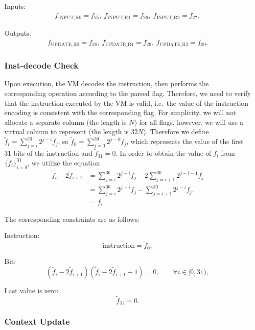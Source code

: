 Inputs:
\begin{align*}
    f_\text{INPUT\_R0} = f_{25},\ f_\text{INPUT\_R1} = f_{26},\ f_\text{INPUT\_R2} = f_{27},
\end{align*}

Outputs:
\begin{align*}
    f_\text{UPDATE\_R0} = f_{28},\ f_\text{UPDATE\_R1} = f_{29},\ f_\text{UPDATE\_R2} = f_{30}.
\end{align*}

\subsubsection{Inst-decode Check}

Upon execution, the VM decodes the instruction, then performs the corresponding operation according to the parsed flag. Therefore, we need to verify that the instruction executed by the VM is valid, i.e.\ the value of the instruction encoding is consistent with the corresponding flag. For simplicity, we will not allocate a separate column (the length is $N$) for all flags, however, we will use a virtual column to represent (the length is $32N$). Therefore we define $\widetilde f_i = \sum_{j=i}^{30} 2^{j-i} f_j$, so $\widetilde f_0 = \sum_{j=0}^{30} 2^{j-0} f_j$, which represents the value of the first 31 bits of the instruction and $\widetilde f_{31} = 0$. In order to obtain the value of $f_i$ from $\{\widetilde f_i \}_{i=0}^{31}$, we utilize the equation
\begin{align*}
    \widetilde f_i - 2\widetilde f_{i+1} &= \sum_{j=i}^{30} 2^{j-i} f_j - 2 \sum_{j=i+1}^{30} 2^{j-i-1} f_j \\
    &= \sum_{j=i}^{30} 2^{j-i} f_j - \sum_{j=i+1}^{30} 2^{j-i} f_j. \\
    &= f_i
\end{align*}

The corresponding constraints are as follows:

Instruction:
\[ \text{instruction} = \widetilde f_0, \]

Bit:
\[ (\widetilde f_i - 2\widetilde f_{i+1} )(\widetilde f_i - 2\widetilde f_{i+1} - 1) = 0, \qquad \forall i \in [0,31), \]

Last value is zero:
\[ \widetilde f_{31} = 0. \]

\subsubsection{Context Update}

